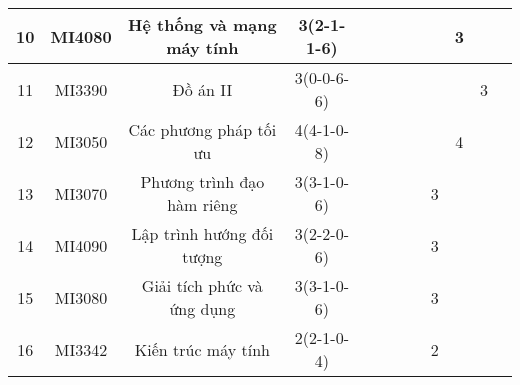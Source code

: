 \documentclass[12pt,a4paper]{report}
\begin{document}
\begin{landscape}
\begin{longtable}[c]{|c|c|c|c|c|c|c|c|c|c|c|c|}
        10                            & MI4080                          & Hệ thống và mạng máy tính                                    & 3(2-1-1-6)                                                                           &             &             &             &             &             & 3           &             &             \\ \hline
        11                            & MI3390                          & Đồ án II                                                     & 3(0-0-6-6)                                                                           &             &             &             &             &             &             & 3           &             \\ \hline
        12                            & MI3050                          & Các phương pháp tối ưu                                       & 4(4-1-0-8)                                                                           &             &             &             &             &             & 4           &             &             \\ \hline
        13                            & MI3070                          & Phương trình đạo hàm riêng                                   & 3(3-1-0-6)                                                                           &             &             &             &             & 3           &             &             &             \\ \hline
        14                            & MI4090                          & Lập trình hướng đối tượng                                    & 3(2-2-0-6)                                                                           &             &             &             &             & 3           &             &             &             \\ \hline
        15                            & MI3080                          & Giải tích phức và ứng dụng                                   & 3(3-1-0-6)                                                                           &             &             &             &             & 3           &             &             &             \\ \hline
        16                            & MI3342                          & Kiến trúc máy tính                                           & 2(2-1-0-4)                                                                           &             &             &             &             & 2           &             &             &             \\ \hline

\end{longtable}
\end{landscape}
\end{document}
